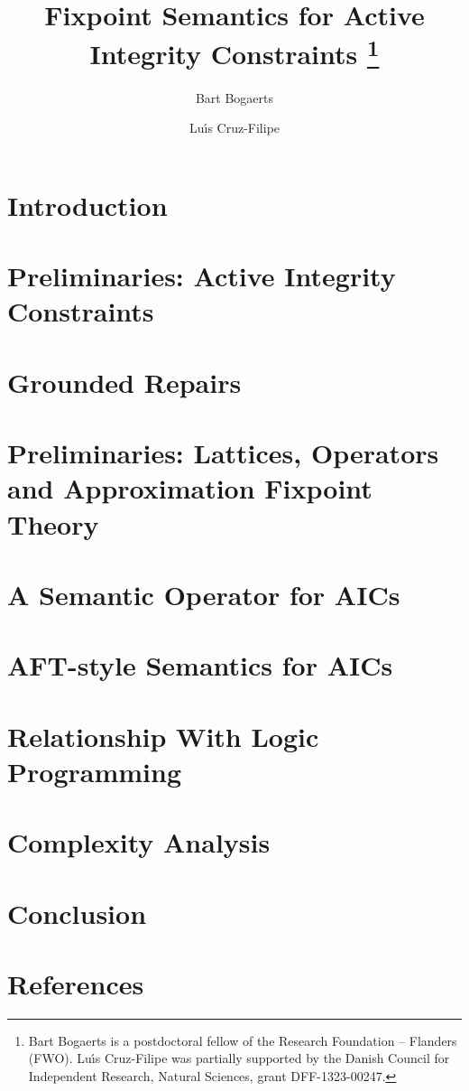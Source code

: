 \documentclass[3p,number,authoryear]{elsarticle}
\title{Fixpoint Semantics for Active Integrity Constraints%
\thanks{Bart Bogaerts is a postdoctoral fellow of the Research Foundation -- Flanders (FWO).
Lu\'\i s Cruz-Filipe was partially supported by the Danish Council for Independent Research, Natural Sciences, grant DFF-1323-00247.}
}
\author[kul]{Bart Bogaerts\corref{cor1}} \ead{bart.bogaerts@cs.kuleuven.be}
\author[sdu]{Lu\'\i s Cruz-Filipe} \ead{lcfilipe@gmail.com}
\begin{document}


\maketitle

\section{Introduction}\label{sec:intro}


\section{Preliminaries: Active Integrity Constraints}\label{sec:prelims}


\section{Grounded Repairs} \label{sec:grounded}


\section{Preliminaries: Lattices, Operators and Approximation Fixpoint Theory}\label{sec:aft}


\section{A Semantic Operator for AICs}\label{sec:operator}


\section{AFT-style Semantics for AICs}\label{sec:approximator}


\section{Relationship With Logic Programming}\label{sec:lp}


\section{Complexity Analysis}\label{sec:complexity}



\section{Conclusion}\label{sec:concl}


\newpage
\section*{References}


\end{document}
